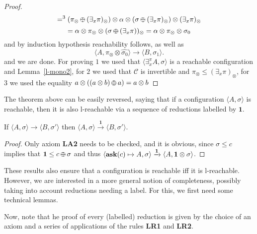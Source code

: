 \documentclass{llncs}
\def\1{{\mathbf 1}}
\def\C{{\mathcal C}}
\newcommand{\comment}[1]{}
\newcommand{\tell}{{\bf tell}}
\newcommand{\ask}{{\bf ask}}
\def\monid{{\mathbf 0}}
\def\1{{\mathbf 1}}
\def\C{{\mathcal C}}
\def\odiv{\, {\ominus\hspace{-7.7pt} \div} \,}
\def\monid{\mathbf{1}}
\begin{document}
\begin{proof}
{$$ =^3 (\pi_\otimes \odiv (\exists_x \pi)_\otimes) \otimes \alpha \otimes (\sigma \odiv (\exists_x \pi)_\otimes) \otimes (\exists_x \pi)_\otimes$$
$$= \alpha \otimes \pi_\otimes \otimes  (\sigma \odiv (\exists_x \pi))_\otimes 
= \alpha \otimes \pi_\otimes \otimes  \sigma_0
$$
and by induction hypothesis reachability follows, as well as 
$$\langle A, \pi_\otimes \otimes \widehat{\sigma_0} \rangle \to \langle B, \sigma_1 \rangle.$$
and we are done. For proving $1$ we used that $\langle \exists^\pi_x A, \sigma \rangle$ is a reachable configuration
and Lemma~\ref{l-mono2}, for $2$ we used that $\C$ is invertible and $\pi_\otimes \leq (\exists_x \pi)_\otimes$,
for $3$ we used the equality $a \otimes ((a \otimes b) \odiv a) = a \otimes b$}
\end{proof}

The theorem above can be easily reversed, saying that if a configuration $\langle A, \sigma \rangle$ is reachable,
then it is also l-reachable via a sequence of reductions labelled by $\monid$.

\begin{lemma}
\label{idred}
If %
$\langle A, \sigma \rangle \to \langle B, \sigma' \rangle$
then %
$\langle A, \sigma \rangle \xrightarrow{\monid}  \langle B, \sigma' \rangle$.
\end{lemma}
\begin{proof}
Only axiom  {\bf LA2} needs to be checked, and it is obvious, since $\sigma \leq c$ implies that 
$\monid \leq c \odiv \sigma$ and thus 
$\langle \hbox{\ask}(c) \mapsto A, \sigma \rangle \xrightarrow{\monid}
  	\langle A, \monid \otimes \sigma \rangle$.
\end{proof}	
	
These results also ensure that a configuration is reachable iff it is l-reachable.
%
However, we are interested in a more general notion of completeness, possibly taking into account 
reductions needing a label. For this, we first need some technical lemmas.
%
\comment{
\begin{lemma}
\label{minor}
Let $\langle A, \tau \rangle$ be a reachable configuration such that
$\sigma \leq \tau$. If $\C$ is invertible then $\langle A, \sigma \rangle$ is a reachable configuration.
%
Moreover, if  $\langle A, \tau \rangle \to \langle B, \tau' \rangle$ then
$\langle A, \sigma \rangle \to \langle B', \sigma' \rangle$ 
with $\sigma' = \tau' \otimes (\sigma \odiv \tau)$.
Furthermore, if $\C$ is also cancellative then $B = B'$.
\end{lemma}
\begin{proof}
If
$\langle B, \1 \rangle \to \langle A, \tau \rangle$,
then $\langle A, \sigma \rangle$ is reachable from
 $\langle \hbox{\tell}(\sigma \odiv \tau) \parallel B, \1 \rangle$.
\end{proof}
}
%
Now, note that he proof of every (labelled) reduction is given by the choice of an axiom 
and a series of applications of the rules {\bf LR1} and  {\bf LR2}.
\end{document}
